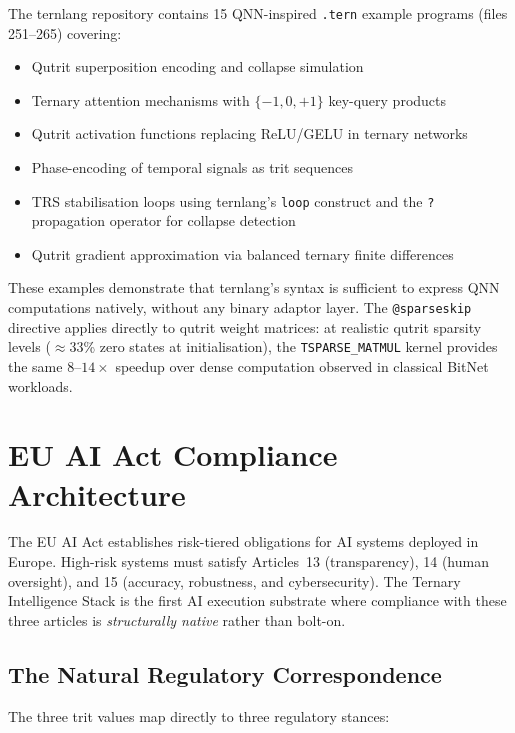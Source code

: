 \documentclass[11pt,a4paper]{article}
\begin{document}
The ternlang repository contains 15 QNN-inspired \texttt{.tern} example
programs (files 251–265) covering:

\begin{itemize}
  \item Qutrit superposition encoding and collapse simulation
  \item Ternary attention mechanisms with $\{-1, 0, +1\}$ key-query products
  \item Qutrit activation functions replacing ReLU/GELU in ternary networks
  \item Phase-encoding of temporal signals as trit sequences
  \item TRS stabilisation loops using ternlang's \texttt{loop} construct
        and the \texttt{?} propagation operator for collapse detection
  \item Qutrit gradient approximation via balanced ternary finite differences
\end{itemize}

These examples demonstrate that ternlang's syntax is sufficient to express
QNN computations natively, without any binary adaptor layer. The \texttt{@sparseskip}
directive applies directly to qutrit weight matrices: at realistic qutrit
sparsity levels ($\approx 33$\% zero states at initialisation), the
\texttt{TSPARSE\_MATMUL} kernel provides the same $8$--$14\times$ speedup
over dense computation observed in classical BitNet workloads.

\section{EU AI Act Compliance Architecture}
\label{sec:euaiact}

The EU AI Act establishes risk-tiered obligations for AI systems deployed in
Europe. High-risk systems must satisfy Articles~13 (transparency), 14 (human
oversight), and 15 (accuracy, robustness, and cybersecurity). The Ternary
Intelligence Stack is the first AI execution substrate where compliance with
these three articles is \emph{structurally native} rather than bolt-on.

\subsection{The Natural Regulatory Correspondence}

The three trit values map directly to three regulatory stances:
\end{document}
